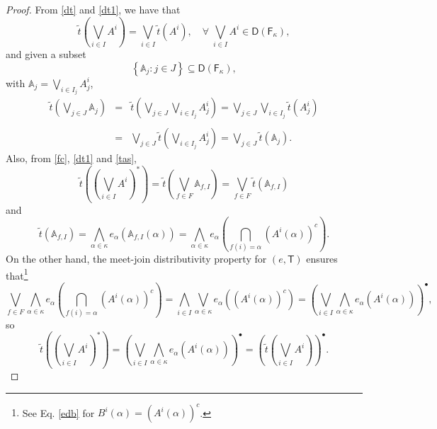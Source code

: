 \documentclass[10pt,a4paper]{amsart}
\begin{document}
\begin{proof}
From \eqref{dt} and \eqref{dt1}, we have that
\begin{equation}
\tilde{t}\left({\textstyle \bigvee_{i\in I}}A^{i}\right)={\textstyle \bigvee_{i\in I}}\tilde{t}\left(A^{i}\right),\quad\forall\;{\textstyle \bigvee_{i\in I}}A^{i}\in\mathsf{D}\left(\mathsf{F}_{\kappa}\right),\label{tas}
\end{equation}
and given a subset 
\[
\left\{ \mathbb{A}_{j}:j\in J\right\} \subseteq\mathsf{D}\left(\mathsf{F}_{\kappa}\right),
\]
with $\mathbb{A}_{j}={\textstyle \bigvee_{i\in I_{j}}}A_{j}^{i}$,
\begin{equation}
\begin{array}{lll}
\tilde{t}\left({\textstyle \bigvee_{j\in J}}\mathbb{A}_{j}\right) & = & \tilde{t}\left({\textstyle \bigvee_{j\in J}}{\textstyle \bigvee_{i\in I_{j}}}A_{j}^{i}\right)={\textstyle \bigvee_{j\in J}}{\textstyle \bigvee_{i\in I_{j}}}\tilde{t}\left(A_{j}^{i}\right)\\
\\
 & = & {\textstyle \bigvee_{j\in J}}\tilde{t}\left({\textstyle \bigvee_{i\in I_{j}}}A_{j}^{i}\right)={\textstyle \bigvee_{j\in J}}\tilde{t}\left(\mathbb{A}_{j}\right).
\end{array}\label{ttu}
\end{equation}
Also, from \eqref{fc}, \eqref{dt1} and \eqref{tas},
\[
\tilde{t}\left(\left({\textstyle \bigvee_{i\in I}}A^{i}\right)^{*}\right)=\tilde{t}\left({\textstyle \bigvee_{f\in F}}\mathbb{A}_{f,I}\right)={\textstyle \bigvee_{f\in F}}\tilde{t}\left(\mathbb{A}_{f,I}\right)
\]
and
\[
\tilde{t}\left(\mathbb{A}_{f,I}\right)={\textstyle \bigwedge_{\alpha\in\kappa}}e_{\alpha}\left(\mathbb{A}_{f,I}\left(\alpha\right)\right)={\textstyle \bigwedge_{\alpha\in\kappa}}e_{\alpha}\left({\textstyle \bigcap_{f\left(i\right)=\alpha}}\left(A^{i}\left(\alpha\right)\right)^{c}\right).
\]
On the other hand, the meet-join distributivity property for $\left(e,\mathsf{T}\right)$
ensures that\footnote{See Eq. \eqref{edb} for $B^{i}\left(\alpha\right)=\left(A^{i}\left(\alpha\right)\right)^{c}$.}
\[
{\textstyle \bigvee_{f\in F}}{\textstyle \bigwedge_{\alpha\in\kappa}}e_{\alpha}\left({\textstyle \bigcap_{f\left(i\right)=\alpha}}\left(A^{i}\left(\alpha\right)\right)^{c}\right)={\textstyle \bigwedge_{i\in I}\bigvee_{\alpha\in\kappa}}e_{\alpha}\left(\left(A^{i}\left(\alpha\right)\right)^{c}\right)=\left({\textstyle \bigvee_{i\in I}\bigwedge_{\alpha\in\kappa}}e_{\alpha}\left(A^{i}\left(\alpha\right)\right)\right)^{\bullet},
\]
so
\begin{equation}
\tilde{t}\left(\left({\textstyle \bigvee_{i\in I}}A^{i}\right)^{*}\right)=\left({\textstyle \bigvee_{i\in I}\bigwedge_{\alpha\in\kappa}}e_{\alpha}\left(A^{i}\left(\alpha\right)\right)\right)^{\bullet}=\left(\tilde{t}\left({\textstyle \bigvee_{i\in I}}A^{i}\right)\right)^{\bullet}.\label{tst}
\end{equation}


\end{proof}
\end{document}
